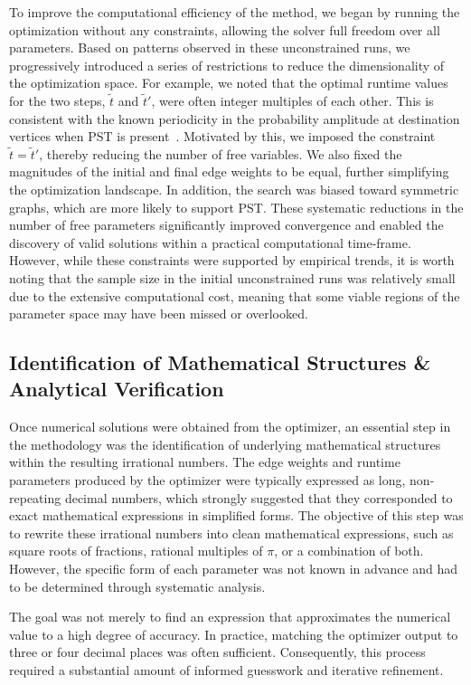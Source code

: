 \documentclass[reprint, aps, 12pt, floatfix]{revtex4-2}
\begin{document}
To improve the computational efficiency of the method, we began by running the optimization without any constraints, allowing the solver full freedom over all parameters. Based on patterns observed in these unconstrained runs, we progressively introduced a series of restrictions to reduce the dimensionality of the optimization space. For example, we noted that the optimal runtime values for the two steps, $\tilde{t}$ and $\tilde{t}'$, were often integer multiples of each other. This is consistent with the known periodicity in the probability amplitude at destination vertices when PST is present~\cite{GodsilChris2012Nnoc}. Motivated by this, we imposed the constraint $\tilde{t}=\tilde{t}'$, thereby reducing the number of free variables. We also fixed the magnitudes of the initial and final edge weights to be equal, further simplifying the optimization landscape. In addition, the search was biased toward symmetric graphs, which are more likely to support PST. These systematic reductions in the number of free parameters significantly improved convergence and enabled the discovery of valid solutions within a practical computational time-frame. However, while these constraints were supported by empirical trends, it is worth noting that the sample size in the initial unconstrained runs was relatively small due to the extensive computational cost, meaning that some viable regions of the parameter space may have been missed or overlooked.

\subsection{Identification of Mathematical Structures \& Analytical Verification}
Once numerical solutions were obtained from the optimizer, an essential step in the methodology was the identification of underlying mathematical structures within the resulting irrational numbers. The edge weights and runtime parameters produced by the optimizer were typically expressed as long, non-repeating decimal numbers, which strongly suggested that they corresponded to exact mathematical expressions in simplified forms. The objective of this step was to rewrite these irrational numbers into clean mathematical expressions, such as square roots of fractions, rational multiples of $\pi$, or a combination of both. However, the specific form of each parameter was not known in advance and had to be determined through systematic analysis.

The goal was not merely to find an expression that approximates the numerical value to a high degree of accuracy. In practice, matching the optimizer output to three or four decimal places was often sufficient. Consequently, this process required a substantial amount of informed guesswork and iterative refinement.
\end{document}
